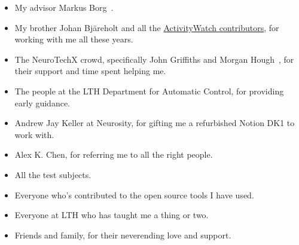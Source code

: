 \begin{itemize}
 \item My advisor Markus Borg~.
 \item My brother Johan Bjäreholt and all the \href{https://activitywatch.net/contributors/}{ActivityWatch contributors}, for working with me all these years.
 \item The NeuroTechX crowd, specifically John Griffiths and Morgan Hough~, for their support and time spent helping me.
 \item The people at the LTH Department for Automatic Control, for providing early guidance.
 \item Andrew Jay Keller at Neurosity, for gifting me a refurbished Notion DK1 to work with.
 \item Alex K. Chen, for referring me to all the right people.
 \item All the test subjects.
 \item Everyone who's contributed to the open source tools I have used.
 \item Everyone at LTH who has taught me a thing or two.
 \item Friends and family, for their neverending love and support.
\end{itemize}
